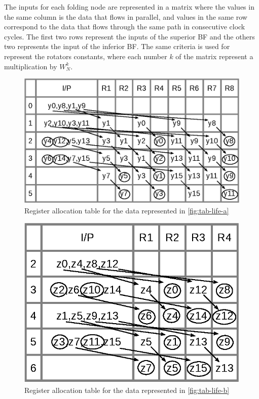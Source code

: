 \documentclass[10pt,times,mathptm,psfig,final,journal,comsoc]{IEEEtran}
\begin{document}
The inputs for each folding node are represented in a matrix where the values in the same column is the data that flows in parallel, and values in the same row correspond to the data that flows through the same path in consecutive clock cycles. The first two rows represent the inputs of the superior BF and the others two represents the input of the inferior BF. The same criteria is used for represent the rotators constants, where each number $k$ of the matrix represent a multiplication by $W^k_N$.

\begin{figure} 
\centering
 \includegraphics[width=0.9\linewidth]{Diagramas/tab_life_a.eps}
\caption{Register allocation table for the data represented in \ref{fig:tab-life-a}}
\label{fig:tab-aloc-a}
\end{figure}
\begin{figure} 
\centering
 \includegraphics[width=0.63\linewidth]{Diagramas/tab_life_b.eps}
\caption{Register allocation table for the data represented in \ref{fig:tab-life-b}}
\label{fig:tab-aloc-b}
\end{figure}
\end{document}
